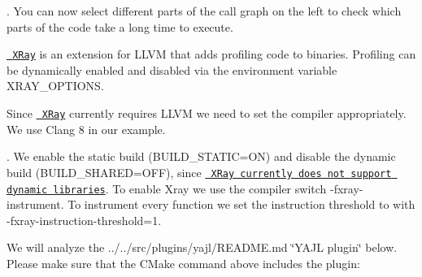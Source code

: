. You can now select different parts of the call graph on the left to check which parts of the code take a long time to execute.

\href{https://llvm.org/docs/XRay.html}{\texttt{ X\+Ray}} is an extension for L\+L\+VM that adds profiling code to binaries. Profiling can be dynamically enabled and disabled via the environment variable {\ttfamily X\+R\+A\+Y\+\_\+\+O\+P\+T\+I\+O\+NS}.

Since \href{https://llvm.org/docs/XRay.html}{\texttt{ X\+Ray}} currently requires L\+L\+VM we need to set the compiler appropriately. We use Clang 8 in our example.


\begin{DoxyCode}{0}
\end{DoxyCode}


. We enable the static build ({\ttfamily B\+U\+I\+L\+D\+\_\+\+S\+T\+A\+T\+IC=ON}) and disable the dynamic build ({\ttfamily B\+U\+I\+L\+D\+\_\+\+S\+H\+A\+R\+ED=O\+FF}), since \href{http://clang-developers.42468.n3.nabble.com/Xray-with-shared-libraries-td4061859.html}{\texttt{ X\+Ray currently does not support dynamic libraries}}. To enable Xray we use the compiler switch {\ttfamily -\/fxray-\/instrument}. To instrument every function we set the instruction threshold to {} with {\ttfamily -\/fxray-\/instruction-\/threshold=1}.


\begin{DoxyCode}{0}
\end{DoxyCode}


We will analyze the ../../src/plugins/yajl/\+R\+E\+A\+D\+ME.md \char`\"{}\+Y\+A\+J\+L plugin\char`\"{} below. Please make sure that the C\+Make command above includes the plugin\+:


